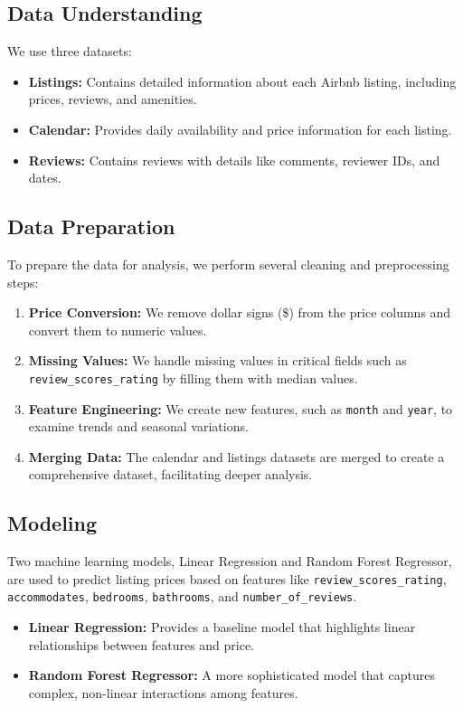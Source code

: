 \documentclass[12pt]{article}
\begin{document}
\subsection{Data Understanding}
We use three datasets:
\begin{itemize}
    \item \textbf{Listings:} Contains detailed information about each Airbnb listing, including prices, reviews, and amenities.
    \item \textbf{Calendar:} Provides daily availability and price information for each listing.
    \item \textbf{Reviews:} Contains reviews with details like comments, reviewer IDs, and dates.
\end{itemize}

\subsection{Data Preparation}
To prepare the data for analysis, we perform several cleaning and preprocessing steps:
\begin{enumerate}
    \item \textbf{Price Conversion:} We remove dollar signs (\$) from the price columns and convert them to numeric values.
    \item \textbf{Missing Values:} We handle missing values in critical fields such as \texttt{review\_scores\_rating} by filling them with median values.
    \item \textbf{Feature Engineering:} We create new features, such as \texttt{month} and \texttt{year}, to examine trends and seasonal variations.
    \item \textbf{Merging Data:} The calendar and listings datasets are merged to create a comprehensive dataset, facilitating deeper analysis.
\end{enumerate}

\subsection{Modeling}
Two machine learning models, Linear Regression and Random Forest Regressor, are used to predict listing prices based on features like \texttt{review\_scores\_rating}, \texttt{accommodates}, \texttt{bedrooms}, \texttt{bathrooms}, and \texttt{number\_of\_reviews}.

\begin{itemize}
    \item \textbf{Linear Regression:} Provides a baseline model that highlights linear relationships between features and price.
    \item \textbf{Random Forest Regressor:} A more sophisticated model that captures complex, non-linear interactions among features.
\end{itemize}
\end{document}
